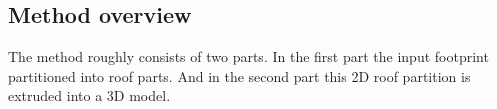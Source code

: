 \subsection{Method overview}
The method roughly consists of two parts.
In the first part the input footprint partitioned into roof parts.
And in the second part this 2D roof partition is extruded into a 3D model.


